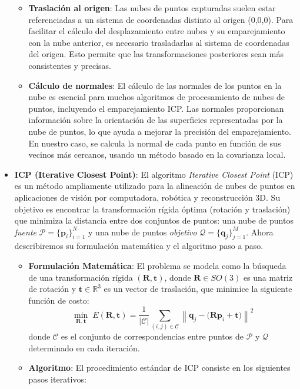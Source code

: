 \documentclass[12pt, a4paper, twoside]{article}
\begin{document}
\begin{itemize}
\begin{itemize}
      \item \textbf{Traslación al origen}: Las nubes de puntos capturadas suelen estar referenciadas a un sistema de coordenadas distinto al origen (0,0,0). Para facilitar 
      el cálculo del desplazamiento entre nubes y su emparejamiento con la nube anterior, es necesario trasladarlas al sistema de coordenadas del origen. Esto permite 
      que las transformaciones posteriores sean más consistentes y precisas.
      \item \textbf{Cálculo de normales}: El cálculo de las normales de los puntos en la nube es esencial para muchos algoritmos de procesamiento de nubes de puntos,
      incluyendo el emparejamiento ICP. Las normales proporcionan información sobre la orientación de las superficies representadas por la nube de puntos, lo que ayuda a 
      mejorar la precisión del emparejamiento. En nuestro caso, se calcula la normal de cada punto en función de sus vecinos más cercanos, usando un método basado en la
      covarianza local.
  \end{itemize}
  \item \textbf{ICP (Iterative Closest Point)}: El algoritmo \textit{Iterative Closest Point} (ICP) es un método ampliamente utilizado para la alineación de nubes de puntos 
  en aplicaciones de visión por computadora, robótica y reconstrucción 3D. Su objetivo es encontrar la transformación rígida óptima (rotación y traslación) que minimiza la 
  distancia entre dos conjuntos de puntos: una nube de puntos \textit{fuente} $\mathcal{P} = \{\mathbf{p}_i\}_{i=1}^{N}$ y una nube de puntos \textit{objetivo} 
  $\mathcal{Q} = \{\mathbf{q}_j\}_{j=1}^{M}$. Ahora describiremos su formulación matemática y el algoritmo paso a paso.
  \begin{itemize}
    \item \textbf{Formulación Matemática}: El problema se modela como la búsqueda de una transformación rígida $(\mathbf{R}, \mathbf{t})$, donde $\mathbf{R} \in SO(3)$ es 
    una matriz de rotación y $\mathbf{t} \in \mathbb{R}^3$ es un vector de traslación, que minimice la siguiente función de costo:
    \[
    \min_{\mathbf{R}, \mathbf{t}} \; 
    E(\mathbf{R}, \mathbf{t}) =
    \frac{1}{|\mathcal{C}|} \sum_{(i,j) \in \mathcal{C}}
    \left\| \mathbf{q}_j - \big(\mathbf{R}\mathbf{p}_i + \mathbf{t}\big) \right\|^2
    \]
    donde $\mathcal{C}$ es el conjunto de correspondencias entre puntos de $\mathcal{P}$ y $\mathcal{Q}$ determinado en cada iteración.  
  
    \item \textbf{Algoritmo}: El procedimiento estándar de ICP consiste en los siguientes pasos iterativos:
  

\end{itemize}
\end{itemize}
\end{document}
